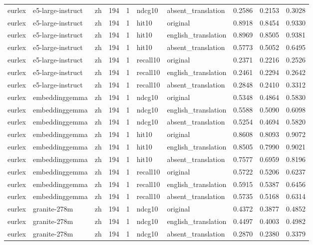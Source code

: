 \begin{tabular}{lllrrllrrr}
eurlex & e5-large-instruct & zh & 194 & 1 & ndcg10 & absent\_translation & 0.2586 & 0.2153 & 0.3028 \\
eurlex & e5-large-instruct & zh & 194 & 1 & hit10 & original & 0.8918 & 0.8454 & 0.9330 \\
eurlex & e5-large-instruct & zh & 194 & 1 & hit10 & english\_translation & 0.8969 & 0.8505 & 0.9381 \\
eurlex & e5-large-instruct & zh & 194 & 1 & hit10 & absent\_translation & 0.5773 & 0.5052 & 0.6495 \\
eurlex & e5-large-instruct & zh & 194 & 1 & recall10 & original & 0.2371 & 0.2216 & 0.2526 \\
eurlex & e5-large-instruct & zh & 194 & 1 & recall10 & english\_translation & 0.2461 & 0.2294 & 0.2642 \\
eurlex & e5-large-instruct & zh & 194 & 1 & recall10 & absent\_translation & 0.2848 & 0.2410 & 0.3312 \\
eurlex & embeddinggemma & zh & 194 & 1 & ndcg10 & original & 0.5348 & 0.4864 & 0.5830 \\
eurlex & embeddinggemma & zh & 194 & 1 & ndcg10 & english\_translation & 0.5588 & 0.5090 & 0.6098 \\
eurlex & embeddinggemma & zh & 194 & 1 & ndcg10 & absent\_translation & 0.5254 & 0.4694 & 0.5820 \\
eurlex & embeddinggemma & zh & 194 & 1 & hit10 & original & 0.8608 & 0.8093 & 0.9072 \\
eurlex & embeddinggemma & zh & 194 & 1 & hit10 & english\_translation & 0.8505 & 0.7990 & 0.9021 \\
eurlex & embeddinggemma & zh & 194 & 1 & hit10 & absent\_translation & 0.7577 & 0.6959 & 0.8196 \\
eurlex & embeddinggemma & zh & 194 & 1 & recall10 & original & 0.5722 & 0.5206 & 0.6237 \\
eurlex & embeddinggemma & zh & 194 & 1 & recall10 & english\_translation & 0.5915 & 0.5387 & 0.6456 \\
eurlex & embeddinggemma & zh & 194 & 1 & recall10 & absent\_translation & 0.5735 & 0.5168 & 0.6314 \\
eurlex & granite-278m & zh & 194 & 1 & ndcg10 & original & 0.4372 & 0.3877 & 0.4852 \\
eurlex & granite-278m & zh & 194 & 1 & ndcg10 & english\_translation & 0.4497 & 0.4003 & 0.4982 \\
eurlex & granite-278m & zh & 194 & 1 & ndcg10 & absent\_translation & 0.2870 & 0.2380 & 0.3379 \\

\end{tabular}
